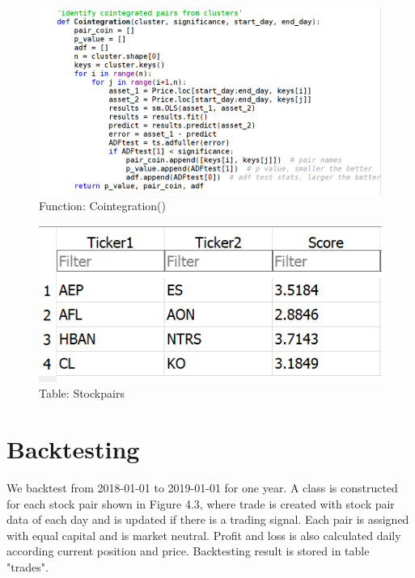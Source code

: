 \begin{figure}
\centering
\includegraphics[scale=0.6]{model/images/cointegration.png}
\caption{Function: Cointegration()}
\label{fig:cointegration}
\end{figure}

\begin{figure}[h!]
\centering
\includegraphics[scale=0.8]{model/images/stockpairs.png}
\caption{Table: Stockpairs}
\label{fig:stockpairs}
\end{figure}




\section{Backtesting}

We backtest from 2018-01-01 to 2019-01-01 for one year. A class is constructed for each stock pair shown in Figure 4.3, where trade is created with stock pair data of each day and is updated if there is a trading signal. Each pair is assigned with equal capital and is market neutral. Profit and loss is also calculated daily according current position and price. Backtesting result is stored in table "trades".


